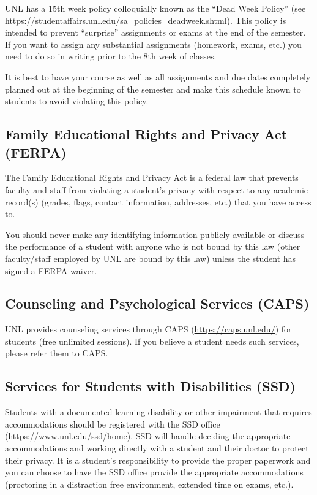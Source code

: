 \documentclass[12pt]{scrartcl}
\begin{document}
UNL has a 15th week policy colloquially known as the ``Dead Week
Policy'' (see \url{https://studentaffairs.unl.edu/sa_policies_deadweek.shtml}).  This policy is intended to prevent
``surprise'' assignments or exams at the end of the semester.
If you want to assign any substantial assignments (homework, 
exams, etc.) you need to do so in writing prior to the 8th week
of classes.  

It is best to have your course as well as all assignments and
due dates completely planned out at the beginning of the semester
and make this schedule known to students to avoid violating this
policy.  

\subsection{Family Educational Rights and Privacy Act (FERPA)}

The Family Educational Rights and Privacy Act is a federal law
that prevents faculty and staff from violating a student's privacy
with respect to any academic record(s) (grades, flags, contact
information, addresses, etc.) that you have access to.  

You should never make any identifying information publicly available
or discuss the performance of a student with anyone who is 
not bound by this law (other faculty/staff employed by UNL are
bound by this law) unless the student has signed a FERPA waiver.

\subsection{Counseling and Psychological Services (CAPS)}

UNL provides counseling services through CAPS 
(\url{https://caps.unl.edu/}) for students (free unlimited 
sessions).  If you believe a student needs such services, please
refer them to CAPS.

\subsection{Services for Students with Disabilities (SSD)}

Students with a documented learning disability or other impairment
that requires accommodations should be registered with the 
SSD office (\url{https://www.unl.edu/ssd/home}).  SSD will handle
deciding the appropriate accommodations and working directly
with a student and their doctor to protect their privacy.  
It is a student's responsibility to provide the proper paperwork
and you can choose to have the SSD office provide the appropriate
accommodations (proctoring in a distraction free environment, 
extended time on exams, etc.).
\end{document}
